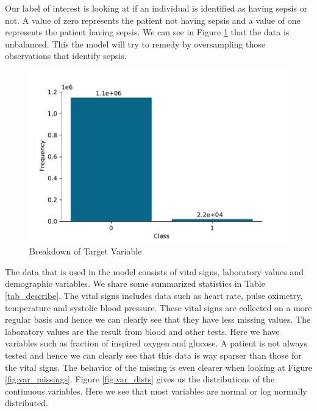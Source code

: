 \documentclass[10pt,letterpaper]{article}
\begin{document}
\par Our label of interest is looking at if an individual is identified as having sepsis or not. A value of zero represents the patient not having sepsis and a value of one represents the patient having sepsis. We can see in Figure \ref{fig:label_dist} that the data is unbalanced. This the model will try to remedy by oversampling those observations that identify sepsis.

\begin{figure}[htbp!]
    \centering
    \includegraphics[scale = 0.7]{Label_dist.pdf}
    \caption{Breakdown of Target Variable}
    \label{fig:label_dist}
\end{figure}

\par The data that is used in the model consists of vital signs, laboratory values and demographic variables. We share some summarized statistics in Table \ref{tab_describe}. The vital signs includes data such as heart rate, pulse oximetry, temperature and systolic blood pressure. These vital signs are collected on a more regular basis and hence we can clearly see that they have less missing values. The laboratory values are the result from blood and other tests. Here we have variables such as fraction of inspired oxygen and glucose. A patient is not always tested and hence we can clearly see that this data is way sparser than those for the vital signs. The behavior of the missing is even clearer when looking at Figure \ref{fig:var_missings}. Figure \ref{fig:var_dists} gives us the distributions of the continuous variables. Here we see that most variables are normal or log normally distributed. 


\end{document}
